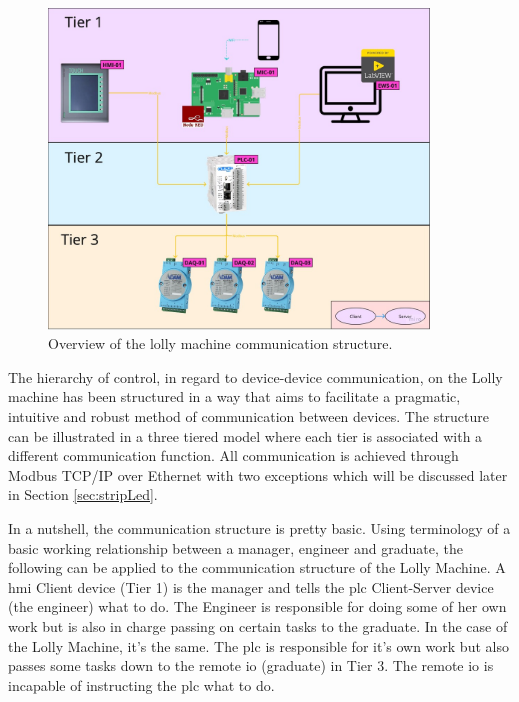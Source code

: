         \begin{figure}[H]
            \centering
            \includegraphics[width = 0.9\textwidth]{2_images/networkArcitecture.jpg}
            \caption{Overview of the lolly machine communication structure.}
            \label{fig:networkArcitecture}
        \end{figure}     
        


        The hierarchy of control, in regard to device-device communication, on the Lolly machine has been structured in a way that aims to facilitate a pragmatic, intuitive and robust method of communication between devices. The structure can be illustrated in a three tiered model where each tier is associated with a different communication function. All communication is achieved through Modbus TCP/IP over Ethernet with two exceptions which will be discussed later in Section \ref{sec:stripLed}.

        In a nutshell, the communication structure is pretty basic. Using terminology of a basic working relationship between a manager,  engineer and graduate,  the following can be applied to the communication structure of the Lolly Machine. A \acrshort{hmi} Client device (Tier 1) is the manager and tells the \acrshort{plc} Client-Server device (the engineer) what to do. The Engineer is responsible for doing some of her own work but is also in charge passing on certain tasks to the graduate. In the case of the Lolly Machine, it’s the same. The \acrshort{plc} is responsible for it’s own work but also passes some tasks down to the remote \acrshort{io} (graduate) in Tier 3. The remote \acrshort{io} is incapable of instructing the \acrshort{plc} what to do. 

